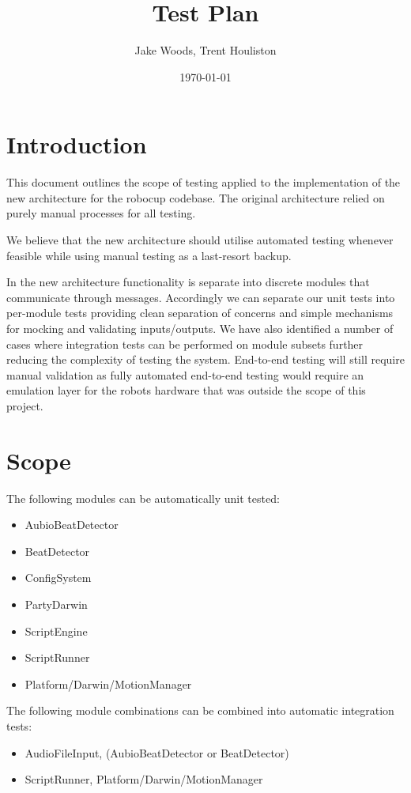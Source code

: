 \documentclass[a4paper]{article}
\title{Test Plan}
\author{Jake Woods, Trent Houliston}
\date{\today}
\begin{document}
\maketitle

\section{Introduction}
	This document outlines the scope of testing applied to the implementation of the new architecture for the robocup codebase. 
	The original architecture relied on purely manual processes for all testing.
	 
	We believe that the new architecture should utilise automated testing whenever feasible while using manual testing as a last-resort backup.
	
	In the new architecture functionality is separate into discrete modules that communicate through messages. 
	Accordingly we can separate our unit tests into per-module tests providing clean separation of concerns and simple mechanisms for mocking and validating inputs/outputs.
	We have also identified a number of cases where integration tests can be performed on module subsets further reducing the complexity of testing the system.
	End-to-end testing will still require manual validation as fully automated end-to-end testing would require an emulation layer for the robots hardware that was outside the scope of this project.

\section{Scope}
	The following modules can be automatically unit tested:
	\begin{itemize}
		\item AubioBeatDetector
		\item BeatDetector
		\item ConfigSystem
		\item PartyDarwin
		\item ScriptEngine
		\item ScriptRunner
		\item Platform/Darwin/MotionManager
	\end{itemize}

	The following module combinations can be combined into automatic integration tests:
	\begin{itemize}
		\item AudioFileInput, (AubioBeatDetector or BeatDetector)
		\item ScriptRunner, Platform/Darwin/MotionManager
	\end{itemize}
\end{document}
